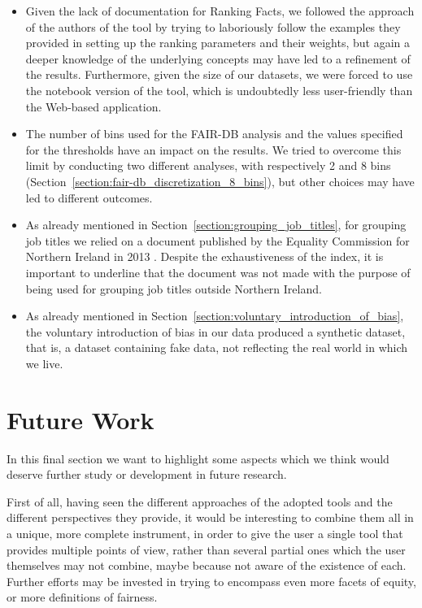 \begin{itemize}
\item Given the lack of documentation for Ranking Facts, we followed the approach of the authors of the tool by trying to laboriously follow the examples they provided in setting up the ranking parameters and their weights, but again a deeper knowledge of the underlying concepts may have led to a refinement of the results. Furthermore, given the size of our datasets, we were forced to use the notebook version of the tool, which is undoubtedly less user-friendly than the Web-based application.
\item The number of bins used for the FAIR-DB analysis and the values specified for the thresholds have an impact on the results. We tried to overcome this limit by conducting two different analyses, with respectively 2 and 8 bins (Section~\ref{section:fair-db_discretization_8_bins}), but other choices may have led to different outcomes.
\item As already mentioned in Section~\ref{section:grouping_job_titles}, for grouping job titles we relied on a document published by the Equality Commission for Northern Ireland in 2013 \cite{equality2013index}. Despite the exhaustiveness of the index, it is important to underline that the document was not made with the purpose of being used for grouping job titles outside Northern Ireland.
\item As already mentioned in Section~\ref{section:voluntary_introduction_of_bias}, the voluntary introduction of bias in our data produced a synthetic dataset, that is, a dataset containing fake data, not reflecting the real world in which we live.
\end{itemize}


\section{Future Work}
In this final section we want to highlight some aspects which we think would deserve further study or development in future research.

First of all, having seen the different approaches of the adopted tools and the different perspectives they provide, it would be interesting to combine them all in a unique, more complete instrument, in order to give the user a single tool that provides multiple points of view, rather than several partial ones which the user themselves may not combine, maybe because not aware of the existence of each. Further efforts may be invested in trying to encompass even more facets of equity, or more definitions of fairness.


